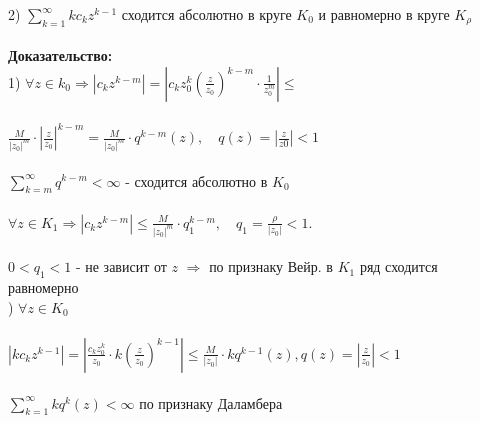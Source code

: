 \documentclass[a4paper,12pt]{article} %
\begin{document}
2) $\sum\limits_{k = 1}^\infty k c_k z^{k - 1}$ сходится абсолютно в круге $K_0$ и равномерно в круге $K_{\rho}$ \\
\ \\
\noindent\textbf{Доказательство:} \\
1) $\forall z \in k_0 \Rightarrow |c_k z^{k - m} | = |c_k z_0^k \left(\frac{z}{z_0} \right)^{k - m} \cdot \frac{1}{z_0^m} | \leqslant$ \\
\ \\
$
 \frac{M}{|z_0|^m} \cdot | \frac{z}{z_0} |^{k-m} = \frac{M}{|z_0|^m} \cdot q^{k - m} (z), \quad q(z) = |\frac{z}{z0}| < 1
$\\
\ \\
$\sum\limits_{k = m}^\infty q^{k - m} < \infty $ - сходится абсолютно в $K_0$\\
\ \\
$ \forall z \in K_1 \Rightarrow |c_k z^{k - m}| \leqslant \frac{M}{|z_0|^m} \cdot q_1^{k - m}, \quad q_1 = \frac{\rho}{|z_0|} < 1.
$\\
\ \\
$0 < q_1 < 1$ - не зависит от $z$ $\Rightarrow$ по признаку Вейр. в $K_1$ ряд сходится равномерно\\
\newpage
{}) $\forall z \in K_0$ \\
\ \\
$ |k c_k z^{k-1} | = | \frac{c_k z_0^k}{z_0} \cdot k\left( \frac{z}{z_0} \right)^{k-1} | \leqslant \frac{M}{|z_0|} \cdot  k q^{k - 1}(z), q(z) = | \frac{z}{z_0} | < 1 $ \\
\ \\
$ \sum\limits_{k = 1}^\infty k q^k(z) < \infty $ по признаку Даламбера\\
\ \\
\end{document}
